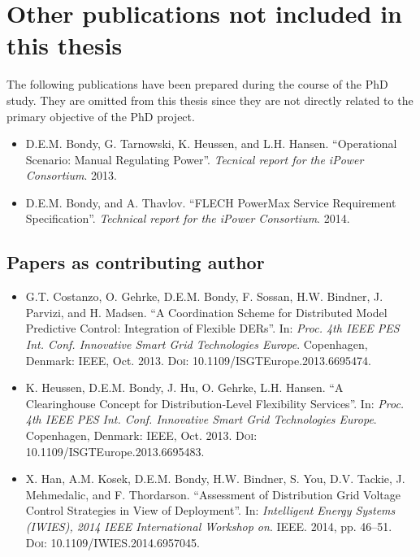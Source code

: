 \section*{Other publications not included in this thesis}
The following publications have been prepared during the course of the PhD study. They are omitted from this thesis since they are not directly related to the primary objective of the PhD project.
\begin{itemize}
	\item D.E.M. Bondy, G. Tarnowski, K. Heussen, and L.H. Hansen. ``Operational Scenario: Manual Regulating Power''. \emph{Tecnical report for the iPower Consortium}. 2013.
	\item D.E.M. Bondy, and A. Thavlov. ``FLECH PowerMax Service Requirement Specification''. \emph{Technical report for the iPower Consortium}. 2014.
\end{itemize}

\subsection*{Papers as contributing author}
\begin{itemize}
	\item G.T. Costanzo, O. Gehrke, D.E.M. Bondy, F. Sossan, H.W. Bindner, J. Parvizi, and H. Madsen. ``A Coordination Scheme for Distributed Model Predictive Control: Integration of Flexible DERs''. In: \emph{Proc. 4th IEEE PES Int. Conf. Innovative Smart Grid Technologies Europe}. Copenhagen, Denmark: IEEE, Oct. 2013. \textsc{Doi}: 10.1109/ISGTEurope.2013.6695474.
	\item K. Heussen, D.E.M. Bondy, J. Hu, O. Gehrke, L.H. Hansen. ``A Clearinghouse Concept for Distribution-Level Flexibility Services''. In: \emph{Proc. 4th IEEE PES Int. Conf. Innovative Smart Grid Technologies Europe}. Copenhagen, Denmark: IEEE, Oct. 2013. \textsc{Doi}: 10.1109/ISGTEurope.2013.6695483.
	\item X. Han, A.M. Kosek, D.E.M. Bondy, H.W. Bindner, S. You, D.V. Tackie, J. Mehmedalic, and F. Thordarson. ``Assessment of Distribution Grid Voltage Control Strategies in View of Deployment''. In: \emph{Intelligent Energy Systems (IWIES), 2014 IEEE International Workshop on}. IEEE. 2014, pp. 46–51. \textsc{Doi}: 10.1109/IWIES.2014.6957045.
\end{itemize}

